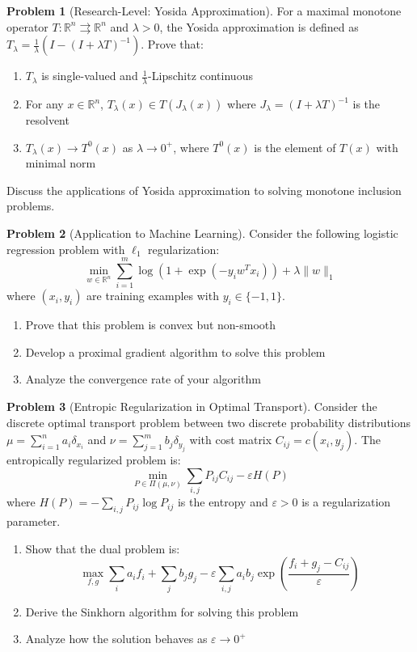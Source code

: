 \documentclass[12pt,a4paper]{article}
\theoremstyle{definition}
\newtheorem{problem}{Problem}[section]
\begin{document}
\begin{problem}[Research-Level: Yosida Approximation]
For a maximal monotone operator $T: \mathbb{R}^n \rightrightarrows \mathbb{R}^n$ and $\lambda > 0$, the Yosida approximation is defined as $T_\lambda = \frac{1}{\lambda}(I - (I + \lambda T)^{-1})$. Prove that:
\begin{enumerate}[label=(\alph*)]
\item $T_\lambda$ is single-valued and $\frac{1}{\lambda}$-Lipschitz continuous
\item For any $x \in \mathbb{R}^n$, $T_\lambda(x) \in T(J_\lambda(x))$ where $J_\lambda = (I + \lambda T)^{-1}$ is the resolvent
\item $T_\lambda(x) \to T^0(x)$ as $\lambda \to 0^+$, where $T^0(x)$ is the element of $T(x)$ with minimal norm
\end{enumerate}
Discuss the applications of Yosida approximation to solving monotone inclusion problems.
\end{problem}

\begin{problem}[Application to Machine Learning]
Consider the following logistic regression problem with $\ell_1$ regularization:
\[\min_{w \in \mathbb{R}^n} \sum_{i=1}^m \log(1 + \exp(-y_i w^T x_i)) + \lambda \|w\|_1\]
where $(x_i, y_i)$ are training examples with $y_i \in \{-1, 1\}$.
\begin{enumerate}[label=(\alph*)]
\item Prove that this problem is convex but non-smooth
\item Develop a proximal gradient algorithm to solve this problem
\item Analyze the convergence rate of your algorithm
\end{enumerate}
\end{problem}

\begin{problem}[Entropic Regularization in Optimal Transport]
Consider the discrete optimal transport problem between two discrete probability distributions $\mu = \sum_{i=1}^n a_i \delta_{x_i}$ and $\nu = \sum_{j=1}^m b_j \delta_{y_j}$ with cost matrix $C_{ij} = c(x_i, y_j)$. The entropically regularized problem is:
\[\min_{P \in \Pi(\mu, \nu)} \sum_{i,j} P_{ij} C_{ij} - \varepsilon H(P)\]
where $H(P) = -\sum_{i,j} P_{ij} \log P_{ij}$ is the entropy and $\varepsilon > 0$ is a regularization parameter.
\begin{enumerate}[label=(\alph*)]
\item Show that the dual problem is:
\[\max_{f, g} \sum_i a_i f_i + \sum_j b_j g_j - \varepsilon \sum_{i,j} a_i b_j \exp\left(\frac{f_i + g_j - C_{ij}}{\varepsilon}\right)\]
\item Derive the Sinkhorn algorithm for solving this problem
\item Analyze how the solution behaves as $\varepsilon \to 0^+$
\end{enumerate}
\end{problem}
\end{document}
